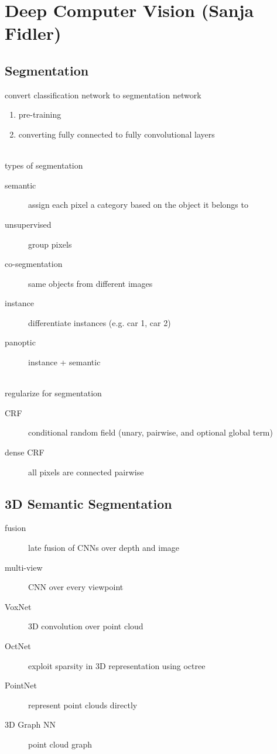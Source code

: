 \documentclass[]{article}
\theoremstyle{definition}
\begin{document}
    \section{Deep Computer Vision {\small(Sanja Fidler)}}%
    \label{sec:deep_computer_vision}

    \subsection{Segmentation}%
    \label{sub:segmentation}

    convert classification network to segmentation network
    \begin{enumerate}
        \item pre-training
        \item converting fully connected to fully convolutional layers
    \end{enumerate}
    \hfill \\
    types of segmentation
    \begin{description}
        \item[semantic] assign each pixel a category based on the object it belongs to
        \item[unsupervised] group pixels
        \item[co-segmentation] same objects from different images
        \item[instance] differentiate instances (e.g. car 1, car 2)
        \item[panoptic] instance + semantic
    \end{description}
    \hfill \\
    regularize for segmentation
    \begin{description}
        \item[CRF] conditional random field (unary, pairwise, and optional global term)
        \item[dense CRF] all pixels are connected pairwise
    \end{description}

    \subsection{3D Semantic Segmentation}%
    \label{sub:3d_semantic_segmentation}
    \begin{description}
        \item[fusion] late fusion of CNNs over depth and image
        \item[multi-view] CNN over every viewpoint
        \item[VoxNet] 3D convolution over point cloud
        \item[OctNet] exploit sparsity in 3D representation using octree
        \item[PointNet] represent point clouds directly
        \item[3D Graph NN] point cloud graph
    \end{description}
\end{document}
